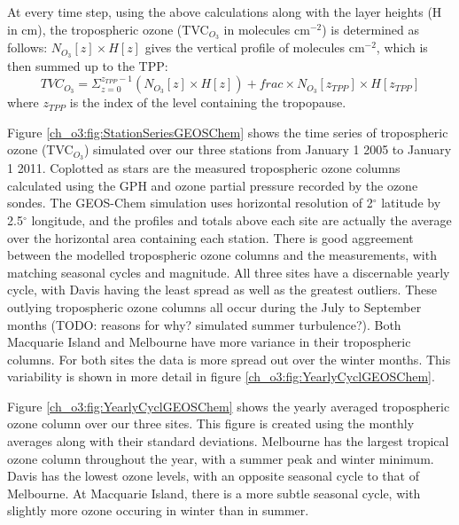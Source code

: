     At every time step, using the above calculations along with the layer heights (H in cm), the tropospheric ozone (TVC$_{O_3}$ in molecules cm$^{-2}$) is determined as follows: $N_{O_3}[z] \times H[z]$ gives the vertical profile of molecules cm$^{-2}$, which is then summed up to the TPP:
    \begin{equation*}
     TVC_{O_3} = \Sigma_{z=0}^{z_{TPP}-1} \left( N_{O_3}[z] \times H[z] \right) + frac \times N_{O_3}[z_{TPP}] \times H[z_{TPP}]
    \end{equation*}
    where $z_{TPP}$ is the index of the level containing the tropopause.
    
    Figure \ref{ch_o3:fig:StationSeriesGEOSChem} shows the time series of tropospheric ozone (TVC$_{O_3}$) simulated over our three stations from January 1 2005 to January 1 2011.
    Coplotted as stars are the measured tropospheric ozone columns calculated using the GPH and ozone partial pressure recorded by the ozone sondes.
    The GEOS-Chem simulation uses horizontal resolution of 2$^{\circ}$ latitude by 2.5$^{\circ}$ longitude, and the profiles and totals above each site are actually the average over the horizontal area containing each station.
    There is good aggreement between the modelled tropospheric ozone columns and the measurements, with matching seasonal cycles and magnitude.
    All three sites have a discernable yearly cycle, with Davis having the least spread as well as the greatest outliers.
    These outlying tropospheric ozone columns all occur during the July to September months (TODO: reasons for why? simulated summer turbulence?).
    Both Macquarie Island and Melbourne have more variance in their tropospheric columns.
    For both sites the data is more spread out over the winter months.
    This variability is shown in more detail in figure \ref{ch_o3:fig:YearlyCyclGEOSChem}.
    
    Figure \ref{ch_o3:fig:YearlyCyclGEOSChem} shows the yearly averaged tropospheric ozone column over our three sites.
    This figure is created using the monthly averages along with their standard deviations.
    Melbourne has the largest tropical ozone column throughout the year, with a summer peak and winter minimum.
    Davis has the lowest ozone levels, with an opposite seasonal cycle to that of Melbourne.
    At Macquarie Island, there is a more subtle seasonal cycle, with slightly more ozone occuring in winter than in summer.
    
